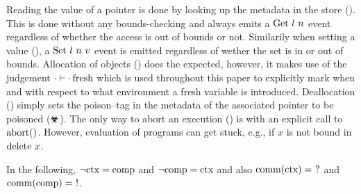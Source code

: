 \documentclass[utf8,acmsmall,review,screen,dvipsnames]{acmart}
\begin{document}
Reading the value of a pointer is done by looking up the metadata in the store ().
This is done without any bounds-checking and always emits a $\text{Get}\ l\ n$ event regardless of whether the access is out of bounds or not.
Similarily when setting a value (), a $\ev{Set}\ \loc\ n\ \valueexpr$ event is emitted regardless of wether the set is in or out of bounds.
Allocation of objects () does the expected, however, it makes use of the judgement $\cdot\vdash{\cdot}\operatorname{fresh}$ which is used throughout this paper to explicitly mark when and with respect to what environment a fresh variable is introduced.
Deallocation () simply sets the poison--tag in the metadata of the associated pointer to be poisoned ($\poisoned$).
The only way to abort an execution () is with an explicit call to $\text{abort()}$.
However, evaluation of programs can get stuck, e.g., if $x$ is not bound in $\text{delete}\ x$.

In the following, $\neg\text{ctx}=\text{comp}$ and $\neg\text{comp}=\text{ctx}$ and also $\operatorname{comm}(\text{ctx})=\  ? $ and $\operatorname{comm}(\comp)=\ \comptoctx$.
\end{document}
